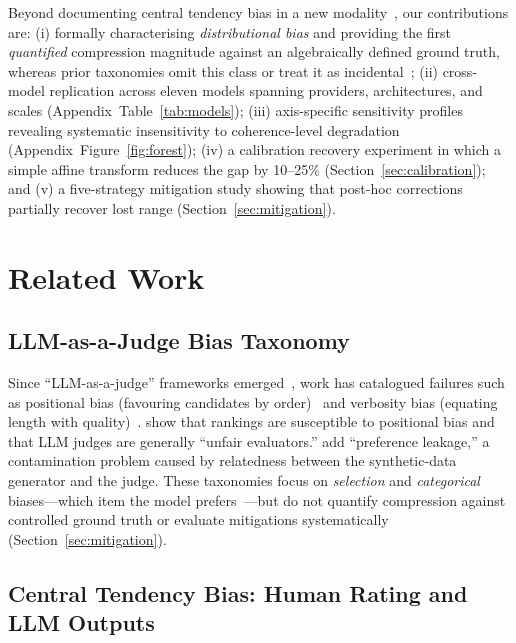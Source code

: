 \documentclass[11pt]{article}
\begin{document}
Beyond documenting central tendency bias in a new
modality~\citep{stevens1971issues,guilford1954psychometric}, our
contributions are: (i) formally characterising \emph{distributional
bias} and providing the first \emph{quantified} compression magnitude
against an algebraically defined ground truth, whereas prior taxonomies
omit this class or treat it as incidental~\citep{zheng2023judging,wang2024large};
(ii) cross-model replication across eleven models spanning providers,
architectures, and scales (Appendix~Table~\ref{tab:models}); (iii) axis-specific
sensitivity profiles revealing systematic insensitivity to
coherence-level degradation~\citep{barzilay2008modeling,lapata2005automatic}
(Appendix~Figure~\ref{fig:forest}); (iv) a calibration recovery experiment in
which a simple affine transform reduces the gap by 10--25\%
(Section~\ref{sec:calibration}); and (v) a five-strategy mitigation
study showing that post-hoc corrections partially recover lost
range (Section~\ref{sec:mitigation}).

\section{Related Work}
\label{sec:related}

\subsection{LLM-as-a-Judge Bias Taxonomy}

Since ``LLM-as-a-judge'' frameworks emerged~\citep{zheng2023judging},
work has catalogued failures such as positional bias (favouring
candidates by order)~\citep{zheng2023judging,shi2024judging} and
verbosity bias (equating length with quality)~\citep{zheng2023judging}.
\citet{wang2024large} show that rankings are susceptible to positional
bias and that LLM judges are generally ``unfair evaluators.''
\citet{li2025preference} add ``preference leakage,'' a contamination
problem caused by relatedness between the synthetic-data generator and
the judge. These taxonomies focus on \emph{selection} and
\emph{categorical} biases---which item the model
prefers~\citep{zheng2023judging,wang2024large,shi2024judging}---but do
not quantify compression against controlled ground truth or evaluate
mitigations systematically (Section~\ref{sec:mitigation}).

\subsection{Central Tendency Bias: Human Rating and LLM Outputs}
\end{document}
